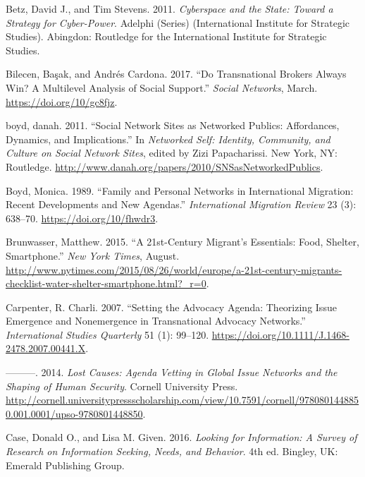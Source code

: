 \begin{cslreferences}
\leavevmode\hypertarget{ref-Betz2011Cyberspace}{}%
Betz, David J., and Tim Stevens. 2011. \emph{Cyberspace and the State:
Toward a Strategy for Cyber-Power}. Adelphi (Series) (International
Institute for Strategic Studies). Abingdon: Routledge for the
International Institute for Strategic Studies.

\leavevmode\hypertarget{ref-Bilecen2017Do}{}%
Bilecen, Başak, and Andrés Cardona. 2017. ``Do Transnational Brokers
Always Win? A Multilevel Analysis of Social Support.'' \emph{Social
Networks}, March. \url{https://doi.org/10/gc8fjz}.

\leavevmode\hypertarget{ref-boyd2011Social}{}%
boyd, danah. 2011. ``Social Network Sites as Networked Publics:
Affordances, Dynamics, and Implications.'' In \emph{Networked Self:
Identity, Community, and Culture on Social Network Sites}, edited by
Zizi Papacharissi. New York, NY: Routledge.
\url{http://www.danah.org/papers/2010/SNSasNetworkedPublics}.

\leavevmode\hypertarget{ref-Boyd1989Family}{}%
Boyd, Monica. 1989. ``Family and Personal Networks in International
Migration: Recent Developments and New Agendas.'' \emph{International
Migration Review} 23 (3): 638--70. \url{https://doi.org/10/fhwdr3}.

\leavevmode\hypertarget{ref-Brunwasser201521st-Century}{}%
Brunwasser, Matthew. 2015. ``A 21st-Century Migrant's Essentials: Food,
Shelter, Smartphone.'' \emph{New York Times}, August.
\url{http://www.nytimes.com/2015/08/26/world/europe/a-21st-century-migrants-checklist-water-shelter-smartphone.html?_r=0}.

\leavevmode\hypertarget{ref-Carpenter2007Setting}{}%
Carpenter, R. Charli. 2007. ``Setting the Advocacy Agenda: Theorizing
Issue Emergence and Nonemergence in Transnational Advocacy Networks.''
\emph{International Studies Quarterly} 51 (1): 99--120.
\url{https://doi.org/10.1111/J.1468-2478.2007.00441.X}.

\leavevmode\hypertarget{ref-Carpenter2014Lost}{}%
---------. 2014. \emph{Lost Causes: Agenda Vetting in Global Issue
Networks and the Shaping of Human Security}. Cornell University Press.
\url{http://cornell.universitypressscholarship.com/view/10.7591/cornell/9780801448850.001.0001/upso-9780801448850}.

\leavevmode\hypertarget{ref-Case2016Looking}{}%
Case, Donald O., and Lisa M. Given. 2016. \emph{Looking for Information:
A Survey of Research on Information Seeking, Needs, and Behavior}. 4th
ed. Bingley, UK: Emerald Publishing Group.


\end{cslreferences}
